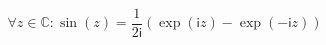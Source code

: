 $$\forall z \in \mathbb{C} : \sin(z) = \frac{1}{2\mathsf{i}} (\exp(\mathsf{i} z) - \exp(-\mathsf{i} z))$$
